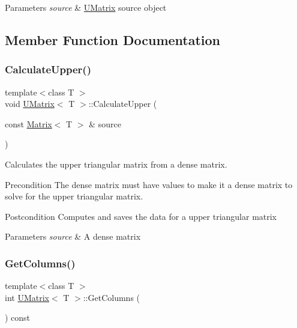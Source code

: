 \begin{DoxyParams}{Parameters}
{\em source} & \mbox{\hyperlink{class_u_matrix}{U\+Matrix}} source object \\
\hline
\end{DoxyParams}


\subsection{Member Function Documentation}
\mbox{\label{class_u_matrix_a63af4ca40c18c71bd0609d4511779852}} 
\subsubsection{\texorpdfstring{CalculateUpper()}{CalculateUpper()}}
{\footnotesize\ttfamily template$<$class T $>$ \\
void \mbox{\hyperlink{class_u_matrix}{U\+Matrix}}$<$ T $>$\+::Calculate\+Upper (\begin{DoxyParamCaption}\item[{const \mbox{\hyperlink{class_matrix}{Matrix}}$<$ T $>$ \&}]{source }\end{DoxyParamCaption})}



Calculates the upper triangular matrix from a dense matrix. 

\begin{DoxyPrecond}{Precondition}
The dense matrix must have values to make it a dense matrix to solve for the upper triangular matrix. 
\end{DoxyPrecond}
\begin{DoxyPostcond}{Postcondition}
Computes and saves the data for a upper triangular matrix
\end{DoxyPostcond}

\begin{DoxyParams}{Parameters}
{\em source} & A dense matrix \\
\hline
\end{DoxyParams}
\mbox{\label{class_u_matrix_a4065961abb79fd43d7abaf10c47e73d8}} 
\subsubsection{\texorpdfstring{GetColumns()}{GetColumns()}}
{\footnotesize\ttfamily template$<$class T $>$ \\
int \mbox{\hyperlink{class_u_matrix}{U\+Matrix}}$<$ T $>$\+::Get\+Columns (\begin{DoxyParamCaption}{ }\end{DoxyParamCaption}) const\hspace{0.3cm}{\ttfamily [virtual]}}



